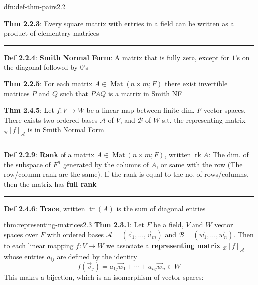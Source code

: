 \documentclass[landscape, 8pt]{extarticle}
\DeclareMathOperator{\Mat}{Mat}
\DeclareMathOperator{\rk}{rk}
\DeclareMathOperator{\Tr}{tr}
\begin{document}
\begin{multicols}{3}
\begin{dfn}{dfn:def-thm-pairs}{2.2}
    \vspace{-5pt}

    \textbf{Thm 2.2.3}: Every square matrix with entries in a field can be written as a product of elementary matrices

    \vspace{-5pt}
    \noindent\rule{\textwidth}{0.6pt}
    \textbf{Def 2.2.4}: \textbf{Smith Normal Form}: A matrix that is fully zero, except for $1$'s on the diagonal followed by $0$'s

    \textbf{Thm 2.2.5}: For each matrix $A\in \Mat(n \times m; F)$ there exist invertible matrices $P$ and $Q$ such that $PAQ$ is a matrix in Smith NF
    
    \textbf{Thm 2.4.5}: Let $f : V \to W$ be a linear map between finite dim. $F$-vector spaces. There exists two ordered bases $\mathcal{A}$ of $V$, and $\mathcal{B}$ of $W$ s.t. the representing matrix ${}_{\mathcal{B}}[f]_{\mathcal{A}}$ is in Smith Normal Form

    \vspace{-5pt}
    \noindent\rule{\textwidth}{0.6pt}

    \textbf{Def 2.2.9}: \textbf{Rank} of a matrix $A\in \Mat(n \times m; F)$, written $\rk A$: The dim. of the subspace of $F^{n}$ generated by the columns of $A$, or same with the row (The row/column rank are the same). If the rank is equal to the no. of rows/columns, then the matrix has \textbf{full rank}

    \vspace{-5pt}
    \noindent\rule{\textwidth}{0.6pt}
    \textbf{Def 2.4.6}: \textbf{Trace}, written $\Tr(A)$ is the sum of diagonal entries
\end{dfn}

\vspace{-5pt}

\begin{thm}{thm:representing-matrices}{2.3}
    \textbf{Thm 2.3.1}: Let $F$ be a field, $V$ and $W$ vector spaces over $F$ with ordered bases $\mathcal{A} = (\vec{v}_{1},\dots,\vec{v}_{m})$ and $\mathcal{B} = (\vec{w}_{1},\dots,\vec{w}_{n})$. Then to each linear mapping $f : V \to W$ we associate a \textbf{representing matrix} ${}_{\mathcal{B}}[f]_{\mathcal{A}}$ whose entries $a_{ij}$ are defined by the identity
    \[f(\vec{v}_{j}) = a_{1j}\vec{w}_{1} + \cdots + a_{nj}\vec{w}_{n}\in W\]
    This makes a bijection, which is an isomorphism of vector spaces:


\end{thm}
\end{multicols}
\end{document}
